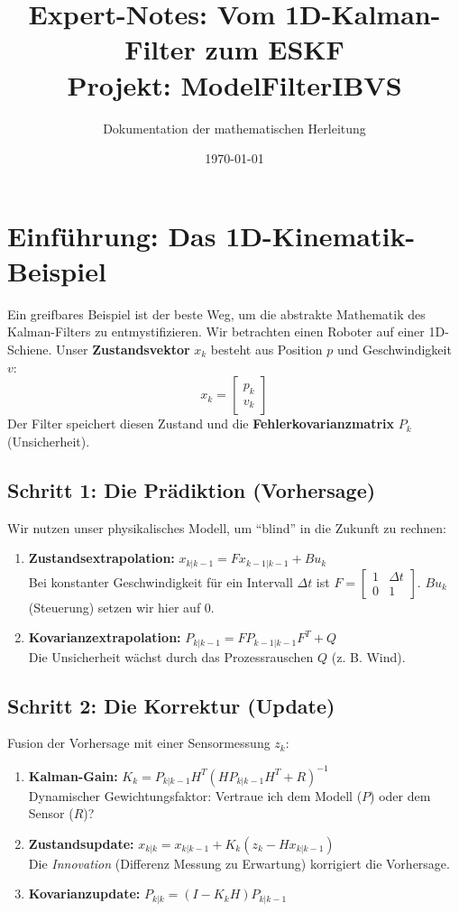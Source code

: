 \documentclass[11pt, a4paper]{article}
\title{Expert-Notes: Vom 1D-Kalman-Filter zum ESKF \\ \large Projekt: ModelFilterIBVS}
\author{Dokumentation der mathematischen Herleitung}
\date{\today}
\begin{document}
\maketitle

\section{Einführung: Das 1D-Kinematik-Beispiel}
Ein greifbares Beispiel ist der beste Weg, um die abstrakte Mathematik des Kalman-Filters zu entmystifizieren. Wir betrachten einen Roboter auf einer 1D-Schiene. Unser \textbf{Zustandsvektor} $x_k$ besteht aus Position $p$ und Geschwindigkeit $v$:
\[ x_k = \begin{bmatrix} p_k \\ v_k \end{bmatrix} \]
Der Filter speichert diesen Zustand und die \textbf{Fehlerkovarianzmatrix} $P_k$ (Unsicherheit).

\subsection{Schritt 1: Die Prädiktion (Vorhersage)}
Wir nutzen unser physikalisches Modell, um "`blind"' in die Zukunft zu rechnen:
\begin{enumerate}
    \item \textbf{Zustandsextrapolation:} $x_{k|k-1} = F x_{k-1|k-1} + B u_k$ \\
    Bei konstanter Geschwindigkeit für ein Intervall $\Delta t$ ist $F = \begin{bmatrix} 1 & \Delta t \\ 0 & 1 \end{bmatrix}$. $B u_k$ (Steuerung) setzen wir hier auf 0.
    \item \textbf{Kovarianzextrapolation:} $P_{k|k-1} = F P_{k-1|k-1} F^T + Q$ \\
    Die Unsicherheit wächst durch das Prozessrauschen $Q$ (z. B. Wind).
\end{enumerate}

\subsection{Schritt 2: Die Korrektur (Update)}
Fusion der Vorhersage mit einer Sensormessung $z_k$:
\begin{enumerate}
    \item \textbf{Kalman-Gain:} $K_k = P_{k|k-1} H^T (H P_{k|k-1} H^T + R)^{-1}$ \\
    Dynamischer Gewichtungsfaktor: Vertraue ich dem Modell ($P$) oder dem Sensor ($R$)?
    \item \textbf{Zustandsupdate:} $x_{k|k} = x_{k|k-1} + K_k (z_k - H x_{k|k-1})$ \\
    Die \textit{Innovation} (Differenz Messung zu Erwartung) korrigiert die Vorhersage.
    \item \textbf{Kovarianzupdate:} $P_{k|k} = (I - K_k H) P_{k|k-1}$
\end{enumerate}
\end{document}
